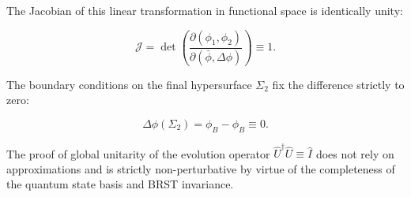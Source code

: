 The Jacobian of this linear transformation in functional space is identically unity:

\begin{equation}\label{eq:1.82}\tag{1.82}
\mathcal{J} = \det\left( \frac{\partial(\phi_1, \phi_2)}{\partial(\bar{\phi}, \Delta\phi)} \right) \equiv 1.
\end{equation}

The boundary conditions on the final hypersurface $\Sigma_2$ fix the difference strictly to zero:

\begin{equation}\label{eq:1.83}\tag{1.83}
\Delta\phi(\Sigma_2) = \phi_B - \phi_B \equiv 0.
\end{equation}

The proof of global unitarity of the evolution operator $\hat{U}^\dagger \hat{U} \equiv \hat{I}$ does not rely on approximations and is strictly non-perturbative by virtue of the completeness of the quantum state basis and BRST invariance.

